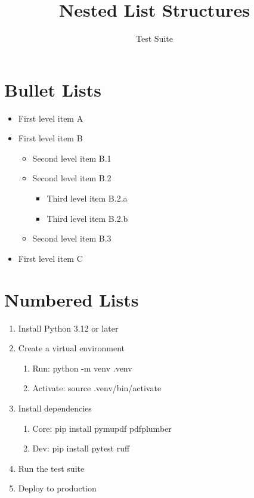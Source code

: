 \documentclass[12pt]{article}
\title{Nested List Structures}
\author{Test Suite}
\begin{document}
\maketitle

\section{Bullet Lists}
\begin{itemize}
    \item First level item A
    \item First level item B
    \begin{itemize}
        \item Second level item B.1
        \item Second level item B.2
        \begin{itemize}
            \item Third level item B.2.a
            \item Third level item B.2.b
        \end{itemize}
        \item Second level item B.3
    \end{itemize}
    \item First level item C
\end{itemize}

\section{Numbered Lists}
\begin{enumerate}
    \item Install Python 3.12 or later
    \item Create a virtual environment
    \begin{enumerate}
        \item Run: python -m venv .venv
        \item Activate: source .venv/bin/activate
    \end{enumerate}
    \item Install dependencies
    \begin{enumerate}
        \item Core: pip install pymupdf pdfplumber
        \item Dev: pip install pytest ruff
    \end{enumerate}
    \item Run the test suite
    \item Deploy to production
\end{enumerate}
\end{document}
